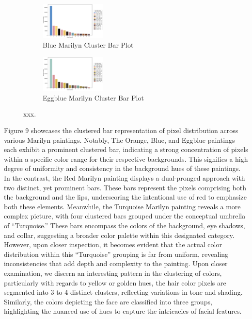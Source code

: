 \documentclass{article}
\begin{document}
\begin{figure}[ht]
  \begin{minipage}{0.6\textwidth}
    \centering
    \begin{subfigure}{0.45\textwidth}
      \centering
      \includegraphics[width=125px]{main_files/figure-latex/6_4_blue_marilyn_cluster_bar_chart.pdf}
      \caption{Blue Marilyn Cluster Bar Plot}
      \label{fig:6_4_orange_marilyn_cluster_bar_chart}
    \end{subfigure}
    \hfill
    \begin{subfigure}{0.45\textwidth}
      \centering
      \includegraphics[width=125px]{main_files/figure-latex/6_5_eggblue_marilyn_cluster_bar_chart.pdf}
      \caption{Eggblue Marilyn Cluster Bar Plot}
      \label{fig:6_5_eggblue_marilyn_cluster_bar_chart}
    \end{subfigure}
  \end{minipage}
  \caption{xxx.}
  \label{fig:marilyn_cluster_bars}
\end{figure}

Figure 9 showcases the clustered bar representation of pixel
distribution across various Marilyn paintings. Notably, The Orange,
Blue, and Eggblue paintings each exhibit a prominent clustered bar,
indicating a strong concentration of pixels within a specific color
range for their respective backgrounds. This signifies a high degree of
uniformity and consistency in the background hues of these paintings. In
the contrast, the Red Marilyn painting displays a dual-pronged approach
with two distinct, yet prominent bars. These bars represent the pixels
comprising both the background and the lips, underscoring the
intentional use of red to emphasize both these elements. Meanwhile, the
Turquoise Marilyn painting reveals a more complex picture, with four
clustered bars grouped under the conceptual umbrella of ``Turquoise.''
These bars encompass the colors of the background, eye shadows, and
collar, suggesting a broader color palette within this designated
category. However, upon closer inspection, it becomes evident that the
actual color distribution within this ``Turquoise'' grouping is far from
uniform, revealing inconsistencies that add depth and complexity to the
painting. Upon closer examination, we discern an interesting pattern in
the clustering of colors, particularly with regards to yellow or golden
hues, the hair color pixels are segmented into 3 to 4 distinct clusters,
reflecting variations in tone and shading. Similarly, the colors
depicting the face are classified into three groups, highlighting the
nuanced use of hues to capture the intricacies of facial features.
\end{document}

